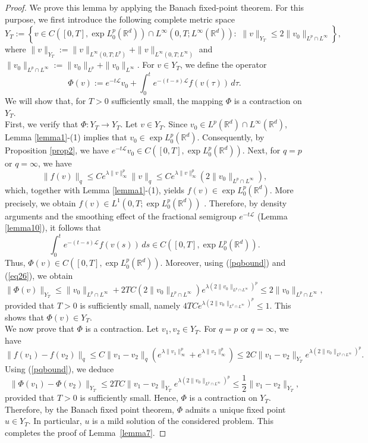 \documentclass[a4paper,11pt]{amsart}
\numberwithin{equation}{section}
\theoremstyle{plain}
\theoremstyle{definition}
\begin{document}
 \begin{proof} We prove this lemma by applying the Banach fixed-point theorem.  For this purpose, we first introduce the following complete metric space
$$Y_T:=\left\{v\in C([0,T],\exp L^p_0(\mathbb{R}^d))\cap L^\infty(0,T;L^\infty(\mathbb{R}^d)):\,\,\|v\|_{Y_T}\leq 2\|v_0\|_{L^p\cap L^\infty}\right\},$$
where $\|v\|_{Y_T}:=\|v\|_{L^\infty(0,T;L^p)}+\|v\|_{L^\infty(0,T;L^\infty)}$ and $\|v_0\|_{L^p\cap L^\infty}:=\|v_0\|_{L^p}+\|v_0\|_{L^\infty}$. For $v\in Y_T$, we define the operator
$$\Phi(v):=e^{-t\mathcal{L}}v_0+\int_0^te^{-(t-s)\mathcal{L}}f(v(\tau))\,d\tau.$$
We will show that, for $T>0$ sufficiently small, the mapping $\Phi$ is a contraction on $Y_T$.\\
First, we verify that $\Phi:Y_T\rightarrow Y_T$. Let $v\in Y_T$. Since $v_0\in L^p(\mathbb{R}^d)\cap L^\infty(\mathbb{R}^d)$,  Lemma \ref{lemma1}-(1) implies that $v_0\in\exp L^p_0(\mathbb{R}^d)$. Consequently, by Proposition \ref{prop2}, we have $e^{-t\mathcal{L}}v_0\in C([0,T],\exp L^p_0(\mathbb{R}^d))$. Next, for $q=p$ or $q=\infty$, we have
\begin{equation}\label{eq26}
\|f(v)\|_{q}\leq Ce^{\lambda\|v\|^p_\infty}\|v\|_{q}\leq Ce^{\lambda\|v\|^p_\infty}(2\|v_0\|_{L^p\cap L^\infty}),
\end{equation}
which, together with Lemma \ref{lemma1}-(1), yields $f(v)\in \exp L^p_0(\mathbb{R}^d)$. More precisely, we obtain $f(v)\in L^1(0,T;\exp L^p_0(\mathbb{R}^d))$ . Therefore, by density arguments and the smoothing effect of the fractional semigroup $e^{-t\mathcal{L}}$ (Lemma \ref{lemma10}), it follows that 
$$\int_0^te^{-(t-s)\mathcal{L}}f(v(s))\,ds\in C([0,T],\exp L^p_0(\mathbb{R}^d)).$$
Thus, $\Phi(v)\in C([0,T],\exp L^p_0(\mathbb{R}^d))$. Moreover, using (\ref{pqbound}) and (\ref{eq26}), we obtain
$$\|\Phi(v)\|_{Y_T}\leq \|v_0\|_{L^p\cap L^\infty} +2TC(2\|v_0\|_{L^p\cap L^\infty})e^{\lambda(2\|v_0\|_{L^p\cap L^\infty})^p}\leq 2\|v_0\|_{L^p\cap L^\infty},$$
provided that $T>0$ is sufficiently small, namely $4TCe^{\lambda(2\|v_0\|_{L^p\cap L^\infty})^p}\leq 1$. This shows that $\Phi(v)\in Y_T$.\\
We now prove that $\Phi$ is a contraction. Let $v_1,v_2\in Y_T$. For $q=p$ or $q=\infty$, we have
$$
\|f(v_1)-f(v_2)\|_{q}\leq C\|v_1-v_2\|_q(e^{\lambda\|v_1\|^p_\infty}+e^{\lambda\|v_2\|^p_\infty})\leq 2C\|v_1-v_2\|_{Y_T} e^{\lambda(2\|v_0\|_{L^p\cap L^\infty})^p}.
$$
Using (\ref{pqbound}), we deduce
$$
\|\Phi(v_1)-\Phi(v_2)\|_{Y_T}\leq 2TC\|v_1-v_2\|_{Y_T} e^{\lambda(2\|v_0\|_{L^p\cap L^\infty})^p}\leq \frac{1}{2}\|v_1-v_2\|_{Y_T},
$$
provided that $T>0$ is sufficiently small. Hence, $\Phi$ is a contraction on $Y_T$. Therefore, by the Banach fixed point theorem, $\Phi$ admits a unique fixed point $u \in Y_T$. In particular, $u$ is a mild solution of the considered problem. This completes the proof of Lemma~\ref{lemma7}.
\end{proof}
\end{document}
